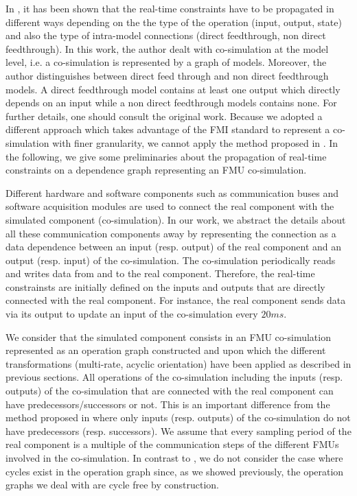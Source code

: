In \cite{faure:2011}, it has been shown that the real-time constraints have to be propagated in different ways depending on the the type of the operation (input, output, state) and also the type of intra-model connections (direct feedthrough, non direct feedthrough). In this work, the author dealt with co-simulation at the model level, i.e. a co-simulation is represented by a graph of models. Moreover, the author distinguishes between direct feed through and non direct feedthrough models. A direct feedthrough model contains at least one output which directly depends on an input while a non direct feedthrough models contains none. For further details, one should consult the original work. Because we adopted a different approach which takes advantage of the FMI standard to represent a co-simulation with finer granularity, we cannot apply the method proposed in \cite{faure:2011}. In the following, we give some preliminaries about the propagation of real-time constraints on a dependence graph representing an FMU co-simulation. 

Different hardware and software components such as communication buses and software acquisition modules are used to connect the real component with the simulated component (co-simulation). In our work, we abstract the details about all these communication components away by representing the connection as a data dependence between an input (resp. output) of the real component and an output (resp. input) of the co-simulation. The co-simulation periodically reads and writes data from and to the real component. Therefore, the real-time constrainsts are initially defined on the inputs and outputs that are directly connected with the real component. For instance, the real component sends data via its output to update an input of the co-simulation every $20ms$.

We consider that the simulated component consists in an FMU co-simulation represented as an operation graph constructed and upon which the different transformations (multi-rate, acyclic orientation) have been applied as described in previous sections. All operations of the co-simulation including the inputs (resp. outputs) of the co-simulation that are connected with the real component can have predecessors/successors or not. This is an important difference from the method proposed in \cite{faure:2011} where only inputs (resp. outputs) of the co-simulation do not have predecessors (resp. successors). We assume that every sampling period of the real component is a multiple of the communication steps of the different FMUs involved in the co-simulation. In contrast to \cite{faure:2011}, we do not consider the case where cycles exist in the operation graph since, as we showed previously, the operation graphs we deal with are cycle free by construction. 

